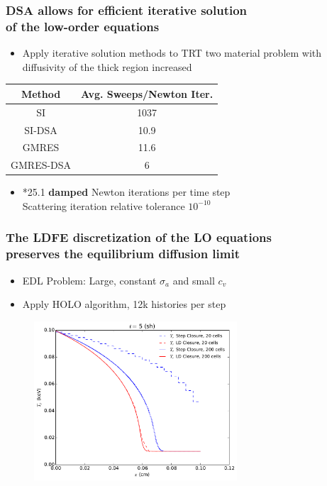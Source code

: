 \documentclass[xcolor=dvipsnames,hyperref={pdfpagelabels=false},unknownkeysallowed]{beamer}
\newcommand{\colb}[1]{{\color{blue} #1}}
\newcommand{\colG}[1]{{\color{Gray!110} #1}}
\newcommand{\colr}[1]{{\color{red} #1}}
\newlength{\wideitemsep}
\let\olditem\item
\renewcommand{\item}{\setlength{\itemsep}{\wideitemsep}\olditem}
\begin{document}
\begin{frame}
    \frametitle{DSA allows for efficient iterative solution \\  of the low-order equations}
    \begin{itemize}
        \item[] Apply iterative solution methods to TRT two material problem
            with diffusivity of the thick region increased
    \end{itemize}
\begin{table}[p]
    \centering
    \begin{tabular}{c|c} \hline
        Method & Avg. Sweeps/Newton Iter. \\ \hline
        SI        & \colr{1037}      \\
        SI-DSA    & \colb{10.9}        \\
        GMRES     & 11.6        \\
        GMRES-DSA & \colb{6}      \\ \hline
    \end{tabular}
\end{table}
\begin{itemize}
    \item[]\colG{*25.1 \textbf{damped} Newton iterations per time step \\ Scattering iteration relative tolerance $10^{-10}$}
    \end{itemize}
\end{frame}

\begin{frame}
    \frametitle{The LDFE discretization of the LO equations \\ preserves the equilibrium diffusion limit}
                \vspace{0.05in}
        \begin{itemize}
            \item EDL Problem: \colG{Large, constant $\sigma_a$ and small $c_v$}
                \vspace{-0.1in}
            \item Apply HOLO algorithm, 12k histories per step
        \end{itemize}
\begin{figure}
    \centering
    \includegraphics[width=0.6755799\textwidth]{diff_limit_compare.pdf}
\end{figure}
\end{frame}
\end{document}
